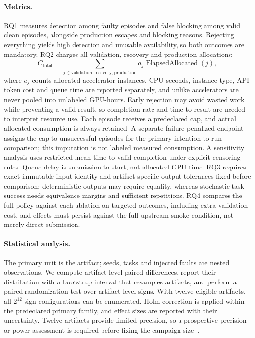 \paragraph{Metrics.} RQ1 measures detection among faulty episodes and false blocking among valid clean episodes, alongside production escapes and blocking reasons. Rejecting everything yields high detection and unusable availability, so both outcomes are mandatory. RQ2 charges all validation, recovery and production allocations:
\begin{equation}
C_{\mathrm{total}}=\sum_{j\in\mathrm{validation,recovery,production}}a_j\operatorname{ElapsedAllocated}(j),
\end{equation}
where $a_j$ counts allocated accelerator instances. CPU-seconds, instance type, API token cost and queue time are reported separately, and unlike accelerators are never pooled into unlabeled GPU-hours. Early rejection may avoid wasted work while preventing a valid result, so completion rate and time-to-result are needed to interpret resource use. Each episode receives a predeclared cap, and actual allocated consumption is always retained. A separate failure-penalized endpoint assigns the cap to unsuccessful episodes for the primary intention-to-run comparison; this imputation is not labeled measured consumption. A sensitivity analysis uses restricted mean time to valid completion under explicit censoring rules. Queue delay is submission-to-start, not allocated GPU time. RQ3 requires exact immutable-input identity and artifact-specific output tolerances fixed before comparison: deterministic outputs may require equality, whereas stochastic task success needs equivalence margins and sufficient repetitions. RQ4 compares the full policy against each ablation on targeted outcomes, including extra validation cost, and effects must persist against the full upstream smoke condition, not merely direct submission.

\paragraph{Statistical analysis.} The primary unit is the artifact; seeds, tasks and injected faults are nested observations. We compute artifact-level paired differences, report their distribution with a bootstrap interval that resamples artifacts, and perform a paired randomization test over artifact-level signs. With twelve eligible artifacts, all $2^{12}$ sign configurations can be enumerated. Holm correction is applied within the predeclared primary family, and effect sizes are reported with their uncertainty. Twelve artifacts provide limited precision, so a prospective precision or power assessment is required before fixing the campaign size~\cite{wohlin2012experimentation}.

